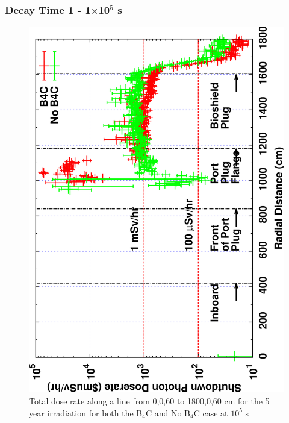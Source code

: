\documentclass[12pt]{article}
\begin{document}
\subsubsection{Decay Time 1 - 1$\times$10$^{5}$ s}
\begin{figure}[ht!]
\centering
\includegraphics[clip,scale=0.12,angle=-90]{../plots/photon_lineout/comp/5yr_dc1.png}
\caption{Total dose rate along a line from 0,0,60 to 1800,0,60 cm for the 5 year irradiation
for both the B$_4$C and No B$_4$C case at $10^5$ s}
\label{fig:photons_5y_dc1_dose}
\end{figure}
\end{document}

